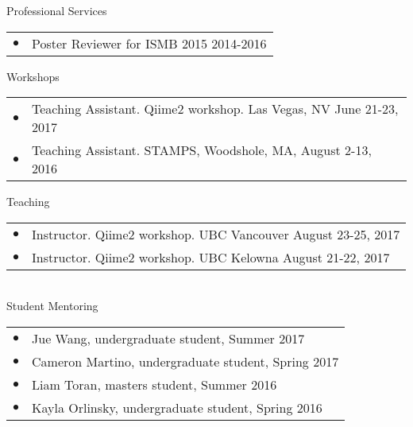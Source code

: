\documentclass{resume} %
\begin{document}
\begin{rSection}{Professional Services}
  \begin{tabular}{ll}
    $\bullet$ & Poster Reviewer for ISMB 2015  2014-2016
  \end{tabular}
\end{rSection}

\begin{rSection}{Workshops}
  \begin{tabular}{ll}
    $\bullet$ & Teaching Assistant. Qiime2 workshop. Las Vegas, NV June 21-23, 2017 \\
    $\bullet$ & Teaching Assistant. STAMPS, Woodshole, MA, August 2-13, 2016 \\
  \end{tabular}
\end{rSection}

\begin{rSection}{Teaching}
  \begin{tabular}{ll}
    $\bullet$ & Instructor. Qiime2 workshop. UBC Vancouver August 23-25, 2017 \\
    $\bullet$ & Instructor. Qiime2 workshop. UBC Kelowna August 21-22, 2017 \\
  \end{tabular}\\[1 mm]
  Student Mentoring\\
  \begin{tabular}{ll}
    $\bullet$  &   Jue Wang, undergraduate student, Summer 2017 \\
    $\bullet$  &   Cameron Martino, undergraduate student, Spring 2017 \\
    $\bullet$  &   Liam Toran, masters student, Summer 2016 \\
    $\bullet$  &   Kayla Orlinsky, undergraduate student, Spring 2016 \\
  \end{tabular}
\end{rSection}
\end{document}

